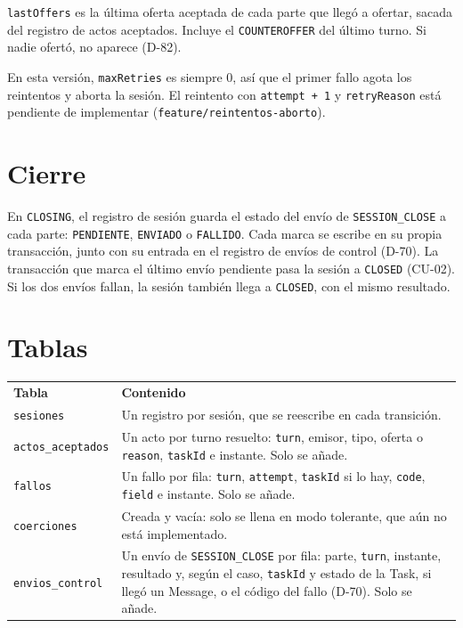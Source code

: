 \texttt{lastOffers} es la última oferta aceptada de cada parte que llegó a ofertar, sacada del registro de actos aceptados. Incluye el \texttt{COUNTEROFFER} del último turno. Si nadie ofertó, no aparece (D-82).

En esta versión, \texttt{maxRetries} es siempre 0, así que el primer fallo agota los reintentos y aborta la sesión. El reintento con \texttt{attempt + 1} y \texttt{retryReason} está pendiente de implementar (\texttt{feature/reintentos-aborto}).

\section{Cierre}

En \texttt{CLOSING}, el registro de sesión guarda el estado del envío de \texttt{SESSION\_CLOSE} a cada parte: \texttt{PENDIENTE}, \texttt{ENVIADO} o \texttt{FALLIDO}. Cada marca se escribe en su propia transacción, junto con su entrada en el registro de envíos de control (D-70). La transacción que marca el último envío pendiente pasa la sesión a \texttt{CLOSED} (CU-02). Si los dos envíos fallan, la sesión también llega a \texttt{CLOSED}, con el mismo resultado.

\section{Tablas}

\begin{tabular}{p{3.5cm}p{10cm}}
  \textbf{Tabla} & \textbf{Contenido} \\
  \texttt{sesiones} & Un registro por sesión, que se reescribe en cada transición. \\
  \texttt{actos\_aceptados} & Un acto por turno resuelto: \texttt{turn}, emisor, tipo, oferta o \texttt{reason}, \texttt{taskId} e instante. Solo se añade. \\
  \texttt{fallos} & Un fallo por fila: \texttt{turn}, \texttt{attempt}, \texttt{taskId} si lo hay, \texttt{code}, \texttt{field} e instante. Solo se añade. \\
  \texttt{coerciones} & Creada y vacía: solo se llena en modo tolerante, que aún no está implementado. \\
  \texttt{envios\_control} & Un envío de \texttt{SESSION\_CLOSE} por fila: parte, \texttt{turn}, instante, resultado y, según el caso, \texttt{taskId} y estado de la Task, si llegó un Message, o el código del fallo (D-70). Solo se añade. \\
\end{tabular}

